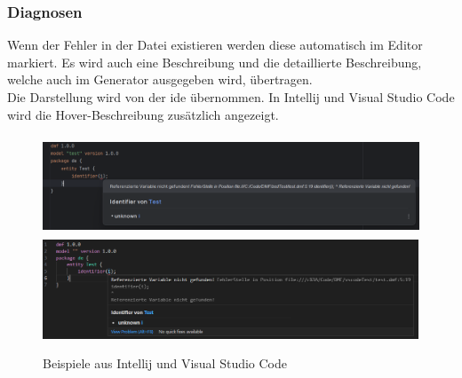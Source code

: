 \documentclass[./einleitung.tex]{subfiles}
\begin{document}
    \subsubsection{Diagnosen}
    Wenn der Fehler in der Datei existieren werden diese automatisch im Editor markiert.
    Es wird auch eine Beschreibung und die detaillierte Beschreibung, welche auch im Generator ausgegeben wird, übertragen.\\
    Die Darstellung wird von der \acrshort{ide} übernommen.
    In Intellij und Visual Studio Code wird die Hover-Beschreibung zusätzlich angezeigt.\\
    \begin{figure}[hH]
        \centering
        \includegraphics[keepaspectratio,height=8em]{bilder/markierung-fehler-intellij}
        \includegraphics[keepaspectratio,height=8em]{bilder/markierung-fehler-vscode}
        \caption{Beispiele aus Intellij und Visual Studio Code}
        \label{fig:markierung-fehler-intellij}
    \end{figure}
\end{document}
